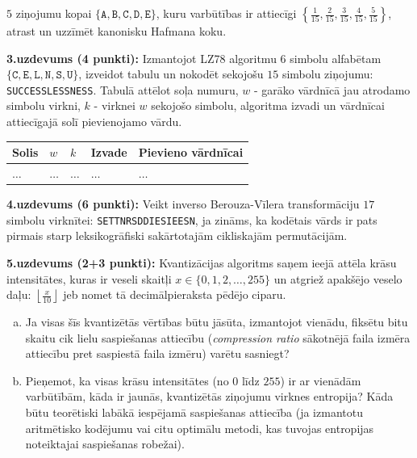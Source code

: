 \documentclass[11pt]{article}
\begin{document}
$5$ ziņojumu kopai $\{ \mathtt{A},\mathtt{B},\mathtt{C},\mathtt{D},\mathtt{E} \}$, kuru varbūtības ir attiecīgi 
${\displaystyle \left\{ \frac{1}{15}, \frac{2}{15},\frac{3}{15},\frac{4}{15},\frac{5}{15} \right\}}$,
atrast un uzzīmēt kanonisku Hafmana koku.


\vspace{6pt}
{\bf 3.uzdevums (4 punkti):}
Izmantojot LZ78 algoritmu 6 simbolu alfabētam $\{\mathtt{C}, \mathtt{E}, \mathtt{L}, \mathtt{N},\mathtt{S}, \mathtt{U}\}$,
izveidot tabulu un nokodēt sekojošu $15$ simbolu ziņojumu: {\tt SUCCESSLESSNESS}. 
Tabulā attēlot soļa numuru, $w$ - garāko vārdnīcā jau atrodamo simbolu virkni, $k$ - virknei $w$ sekojošo simbolu, algoritma izvadi un 
vārdnīcai attiecīgajā solī pievienojamo vārdu. 

\begin{center}
\begin{tabular}{ |l|l|l|l|l| } \hline
Solis & $w$ & $k$ & Izvade & Pievieno vārdnīcai \\ \hline
$\ldots$ & $\ldots$ & $\ldots$ & $\ldots$ & $\ldots$ \\ \hline
\end{tabular}
\end{center}


\vspace{6pt}
{\bf 4.uzdevums (6 punkti):}
Veikt inverso Berouza-Vīlera transformāciju $17$ simbolu virknītei: {\tt SETTNRSDDIESIEESN}, 
ja zināms, ka kodētais vārds ir pats pirmais starp leksikogrāfiski sakārtotajām cikliskajām permutācijām. 


\vspace{6pt}
{\bf 5.uzdevums (2+3 punkti):} 
Kvantizācijas algoritms saņem ieejā attēla krāsu intensitātes, kuras ir veseli skaitļi 
$x \in \{ 0, 1,2,\ldots,255 \}$ un atgriež apakšējo veselo daļu: ${\displaystyle \left\lfloor \frac{x}{10} \right\rfloor}$
jeb nomet tā decimālpieraksta pēdējo ciparu. 
\begin{enumerate}[(a)]
\item 
Ja visas šīs kvantizētās vērtības būtu jāsūta, izmantojot vienādu, fiksētu bitu skaitu \textendash{} cik lielu saspiešanas 
attiecību ({\em compression ratio} \textendash{} sākotnējā faila izmēra attiecību pret saspiestā faila izmēru) varētu sasniegt?
\item
Pieņemot, ka visas krāsu intensitātes (no $0$ līdz $255$) ir ar vienādām varbūtībām, 
kāda ir jaunās, kvantizētās ziņojumu virknes entropija? Kāda būtu teorētiski labākā iespējamā saspiešanas attiecība (ja izmantotu
aritmētisko kodējumu vai citu optimālu metodi, kas tuvojas entropijas noteiktajai saspiešanas robežai).
\end{enumerate}
\end{document}
